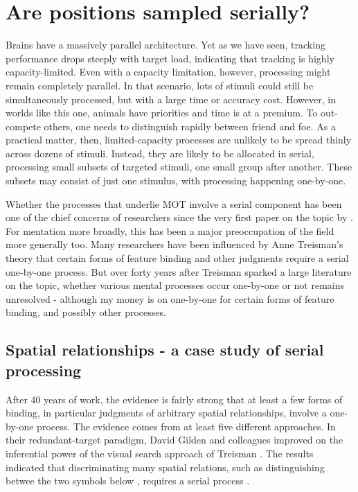 \documentclass[
]{book}
\begin{document}
\hypertarget{serialOrParallel}{%
\chapter{Are positions sampled serially?}\label{serialOrParallel}}

Brains have a massively parallel architecture. Yet as we have seen, tracking performance drops steeply with target load, indicating that tracking is highly capacity-limited. Even with a capacity limitation, however, processing might remain completely parallel. In that scenario, lots of stimuli could still be simultaneously processed, but with a large time or accuracy cost. However, in worlds like this one, animals have priorities and time is at a premium. To out-compete others, one needs to distinguish rapidly between friend and foe. As a practical matter, then, limited-capacity processes are unlikely to be spread thinly across dozens of stimuli. Instead, they are likely to be allocated in serial, processing small subsets of targeted stimuli, one small group after another. These subsets may consist of just one stimulus, with processing happening one-by-one.

Whether the processes that underlie MOT involve a serial component has been one of the chief concerns of researchers since the very first paper on the topic by \citet{pylyshynTrackingMultipleIndependent1988}. For mentation more broadly, this has been a major preoccupation of the field more generally too. Many researchers have been influenced by Anne Treisman's theory that certain forms of feature binding and other judgments require a serial one-by-one process. But over forty years after Treisman sparked a large literature on the topic, whether various mental processes occur one-by-one or not remains unresolved - although my money is on one-by-one for certain forms of feature binding, and possibly other processes.

\hypertarget{spatial-relationships---a-case-study-of-serial-processing}{%
\section{Spatial relationships - a case study of serial processing}\label{spatial-relationships---a-case-study-of-serial-processing}}

After 40 years of work, the evidence is fairly strong that at least a few forms of binding, in particular judgments of arbitrary spatial relationships, involve a one-by-one process. The evidence comes from at least five different approaches. In their redundant-target paradigm, David Gilden and colleagues improved on the inferential power of the visual search approach of Treisman \citep{thorntonParallelSerialProcesses2007}. The results indicated that discriminating many spatial relations, such as distinguishing betwee the two symbols below , requires a serial process \citep{gildenSerialProcessVisual2010}.
\end{document}
